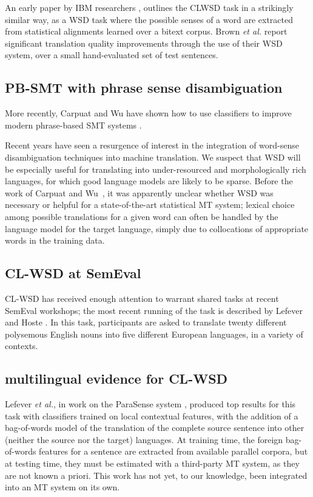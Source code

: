 An early paper by IBM researchers \cite{Brown91word-sensedisambiguation},
outlines the CLWSD task in a strikingly similar way, as a WSD task where the
possible senses of a word are extracted from statistical alignments learned
over a bitext corpus. Brown \textit{et al.} report significant translation
quality improvements through the use of their WSD system, over a small
hand-evaluated set of test sentences.


\subsection{PB-SMT with phrase sense disambiguation}
More recently, Carpuat and Wu have
shown how to use classifiers to improve modern phrase-based SMT systems
\cite{carpuatpsd}.

Recent years have seen a resurgence of interest in the integration of
word-sense disambiguation techniques into machine translation.  We suspect that
WSD will be especially useful for translating into under-resourced and
morphologically rich languages, for which good language models are likely to be
sparse. Before the work of 
Carpuat and Wu~\cite{improvingsmtwsd}, it was apparently unclear whether
WSD was necessary or helpful for a state-of-the-art statistical MT system;
lexical choice among possible translations for a given word can often be
handled by the language model for the target language, simply due to
collocations of appropriate words in the training data.


\subsection{CL-WSD at SemEval}
CL-WSD has received enough attention to warrant shared tasks at recent SemEval
workshops; the most recent running of the task is described by Lefever and
Hoste \cite{task10}.
In this task, participants are asked to translate twenty different polysemous
English nouns into five different European languages, in a variety of contexts.


\subsection{multilingual evidence for CL-WSD}
Lefever \emph{et al.}, in work on the ParaSense system
\cite{lefever-hoste-decock:2011:ACL-HLT2011}, produced top results for
this task with classifiers trained on local contextual features, with the 
addition of a bag-of-words model of the translation of the complete source
sentence into other (neither the source nor the target) languages. At training
time, the foreign bag-of-words features for a sentence are extracted from
available parallel corpora, but at testing time, they must be
estimated with a third-party MT system, as they are not known a priori.
This work has not yet, to our knowledge, been integrated into an MT system
on its own.

